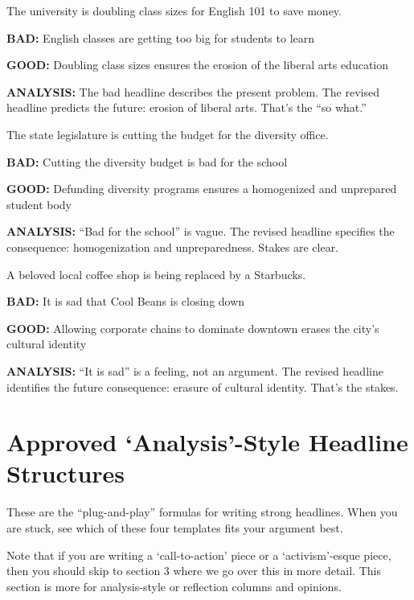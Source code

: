 \documentclass[12pt]{article}
\newcommand{\bad}[1]{\textbf{\textcolor{rose}{BAD:}} #1}
\newcommand{\good}[1]{\textbf{\textcolor{congaree}{GOOD:}} #1}
\newcommand{\context}[1]{#1}
\begin{document}
\begin{exampleblock}
\context{The university is doubling class sizes for English 101 to save money.}

\bad{English classes are getting too big for students to learn}

\good{Doubling class sizes ensures the erosion of the liberal arts education}

\textbf{ANALYSIS:} The bad headline describes the present problem. The revised headline predicts the future: erosion of liberal arts. That's the ``so what.''
\end{exampleblock}

\begin{exampleblock}
\context{The state legislature is cutting the budget for the diversity office.}

\bad{Cutting the diversity budget is bad for the school}

\good{Defunding diversity programs ensures a homogenized and unprepared student body}

\textbf{ANALYSIS:} ``Bad for the school'' is vague. The revised headline specifies the consequence: homogenization and unpreparedness. Stakes are clear.
\end{exampleblock}

\begin{exampleblock}
\context{A beloved local coffee shop is being replaced by a Starbucks.}

\bad{It is sad that Cool Beans is closing down}

\good{Allowing corporate chains to dominate downtown erases the city's cultural identity}

\textbf{ANALYSIS:} ``It is sad'' is a feeling, not an argument. The revised headline identifies the future consequence: erasure of cultural identity. That's the stakes.
\end{exampleblock}

\newpage

\section{Approved `Analysis'-Style Headline Structures}

These are the ``plug-and-play'' formulas for writing strong headlines. When you are stuck, see which of these four templates fits your argument best.

Note that if you are writing a `call-to-action' piece or a `activism'-esque piece, then you should skip to section 3 where we go over this in more detail. This section is more for analysis-style or reflection columns and opinions.
\end{document}
